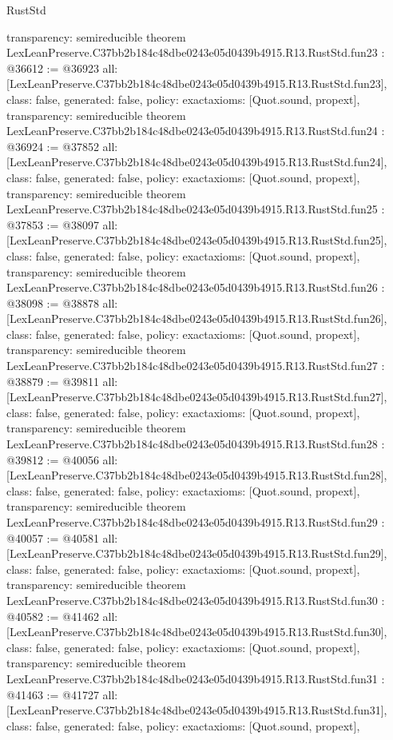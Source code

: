 \begin{lexlean}{RustStd}
\begin{coremodule}
{  transparency: semireducible
}
theorem LexLeanPreserve.C37bb2b184c48dbe0243e05d0439b4915.R13.RustStd.fun23 : @36612 := @36923 {
  all: [LexLeanPreserve.C37bb2b184c48dbe0243e05d0439b4915.R13.RustStd.fun23],
  class: false,
  generated: false,
  policy: exact{axioms: [Quot.sound, propext]},
  transparency: semireducible
}
theorem LexLeanPreserve.C37bb2b184c48dbe0243e05d0439b4915.R13.RustStd.fun24 : @36924 := @37852 {
  all: [LexLeanPreserve.C37bb2b184c48dbe0243e05d0439b4915.R13.RustStd.fun24],
  class: false,
  generated: false,
  policy: exact{axioms: [Quot.sound, propext]},
  transparency: semireducible
}
theorem LexLeanPreserve.C37bb2b184c48dbe0243e05d0439b4915.R13.RustStd.fun25 : @37853 := @38097 {
  all: [LexLeanPreserve.C37bb2b184c48dbe0243e05d0439b4915.R13.RustStd.fun25],
  class: false,
  generated: false,
  policy: exact{axioms: [Quot.sound, propext]},
  transparency: semireducible
}
theorem LexLeanPreserve.C37bb2b184c48dbe0243e05d0439b4915.R13.RustStd.fun26 : @38098 := @38878 {
  all: [LexLeanPreserve.C37bb2b184c48dbe0243e05d0439b4915.R13.RustStd.fun26],
  class: false,
  generated: false,
  policy: exact{axioms: [Quot.sound, propext]},
  transparency: semireducible
}
theorem LexLeanPreserve.C37bb2b184c48dbe0243e05d0439b4915.R13.RustStd.fun27 : @38879 := @39811 {
  all: [LexLeanPreserve.C37bb2b184c48dbe0243e05d0439b4915.R13.RustStd.fun27],
  class: false,
  generated: false,
  policy: exact{axioms: [Quot.sound, propext]},
  transparency: semireducible
}
theorem LexLeanPreserve.C37bb2b184c48dbe0243e05d0439b4915.R13.RustStd.fun28 : @39812 := @40056 {
  all: [LexLeanPreserve.C37bb2b184c48dbe0243e05d0439b4915.R13.RustStd.fun28],
  class: false,
  generated: false,
  policy: exact{axioms: [Quot.sound, propext]},
  transparency: semireducible
}
theorem LexLeanPreserve.C37bb2b184c48dbe0243e05d0439b4915.R13.RustStd.fun29 : @40057 := @40581 {
  all: [LexLeanPreserve.C37bb2b184c48dbe0243e05d0439b4915.R13.RustStd.fun29],
  class: false,
  generated: false,
  policy: exact{axioms: [Quot.sound, propext]},
  transparency: semireducible
}
theorem LexLeanPreserve.C37bb2b184c48dbe0243e05d0439b4915.R13.RustStd.fun30 : @40582 := @41462 {
  all: [LexLeanPreserve.C37bb2b184c48dbe0243e05d0439b4915.R13.RustStd.fun30],
  class: false,
  generated: false,
  policy: exact{axioms: [Quot.sound, propext]},
  transparency: semireducible
}
theorem LexLeanPreserve.C37bb2b184c48dbe0243e05d0439b4915.R13.RustStd.fun31 : @41463 := @41727 {
  all: [LexLeanPreserve.C37bb2b184c48dbe0243e05d0439b4915.R13.RustStd.fun31],
  class: false,
  generated: false,
  policy: exact{axioms: [Quot.sound, propext]},
}
\end{coremodule}
\end{lexlean}
